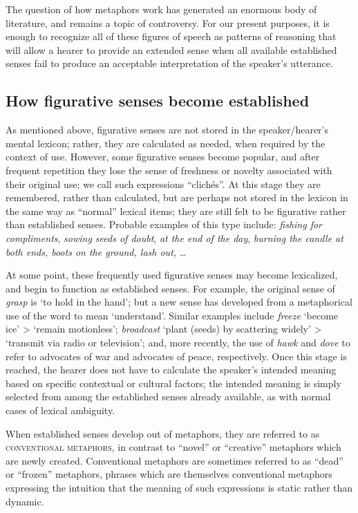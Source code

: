 The question of how metaphors work has generated an enormous body of literature, and remains a topic of controversy. For our present purposes, it is enough to recognize all of these figures of speech as patterns of reasoning that will allow a hearer to provide an extended sense when all available established senses fail to produce an acceptable interpretation of the speaker’s utterance.


\subsection{How figurative senses become established}\label{sec:} %

As mentioned above, figurative senses are not stored in the speaker/hearer’s mental lexicon; rather, they are calculated as needed, when required by the context of use. However, some figurative senses become popular, and after frequent repetition they lose the sense of freshness or novelty associated with their original use; we call such expressions “clichés”. At this stage they are remembered, rather than calculated, but are perhaps not stored in the lexicon in the same way as “normal” lexical items; they are still felt to be figurative rather than established senses. Probable examples of this type include: \textit{fishing for compliments}, \textit{sowing seeds of doubt}, \textit{at the end of the day}, \textit{burning the candle at both ends, boots on the ground, lash out,} …


At some point, these frequently used figurative senses may become lexicalized, and begin to function as established senses. For example, the original sense of \textit{grasp} is ‘to hold in the hand’; but a new sense has developed from a metaphorical use of the word to mean ‘understand’. Similar examples include \textit{freeze} ‘become ice’ > ‘remain motionless’; \textit{broadcast} ‘plant (seeds) by scattering widely’ > ‘transmit via radio or television’; and, more recently, the use of \textit{hawk} and \textit{dove} to refer to advocates of war and advocates of peace, respectively. Once this stage is reached, the hearer does not have to calculate the speaker’s intended meaning based on specific contextual or cultural factors; the intended meaning is simply selected from among the established senses already available, as with normal cases of lexical ambiguity.



When established senses develop out of metaphors, they are referred to as \textsc{conventional metaphors}, in contrast to “novel” or “creative” metaphors which are newly created. Conventional metaphors are sometimes referred to as “dead” or “frozen” metaphors, phrases which are themselves conventional metaphors expressing the intuition that the meaning of such expressions is static rather than dynamic.



